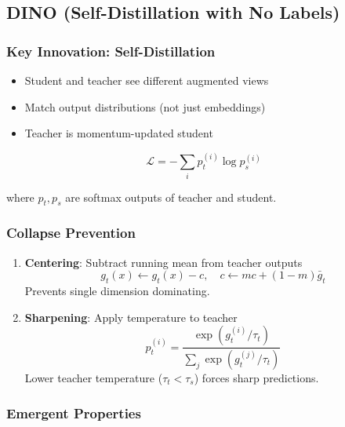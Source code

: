 \subsection{DINO (Self-Distillation with No Labels)}

\subsubsection{Key Innovation: Self-Distillation}

\begin{itemize}
    \item Student and teacher see different augmented views
    \item Match output distributions (not just embeddings)
    \item Teacher is momentum-updated student
\end{itemize}

\begin{equation}
\mathcal{L} = -\sum_i p_t^{(i)} \log p_s^{(i)}
\end{equation}

where $p_t, p_s$ are softmax outputs of teacher and student.

\subsubsection{Collapse Prevention}

\begin{enumerate}
    \item \textbf{Centering}: Subtract running mean from teacher outputs
    \begin{equation}
    g_t(x) \leftarrow g_t(x) - c, \quad c \leftarrow mc + (1-m)\bar{g}_t
    \end{equation}
    Prevents single dimension dominating.
    
    \item \textbf{Sharpening}: Apply temperature to teacher
    \begin{equation}
    p_t^{(i)} = \frac{\exp(g_t^{(i)}/\tau_t)}{\sum_j \exp(g_t^{(j)}/\tau_t)}
    \end{equation}
    Lower teacher temperature ($\tau_t < \tau_s$) forces sharp predictions.
\end{enumerate}

\subsubsection{Emergent Properties}

